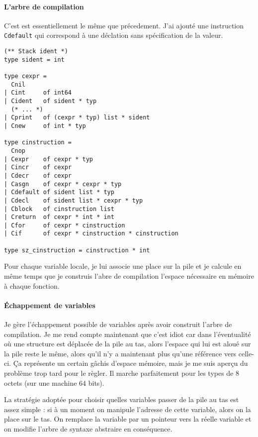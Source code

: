 \documentclass[11pt]{article}
\begin{document}
\paragraph{L'arbre de compilation}

C'est est essentiellement le même que précedement. J'ai ajouté une instruction \texttt{Cdefault} qui correspond à une déclation sans spécification de la valeur.

\begin{verbatim}
(** Stack ident *)
type sident = int

type cexpr =
  Cnil
| Cint     of int64
| Cident   of sident * typ
  (* ... *)
| Cprint   of (cexpr * typ) list * sident
| Cnew     of int * typ

type cinstruction =
  Cnop
| Cexpr    of cexpr * typ
| Cincr    of cexpr
| Cdecr    of cexpr
| Casgn    of cexpr * cexpr * typ
| Cdefault of sident list * typ
| Cdecl    of sident list * cexpr * typ
| Cblock   of cinstruction list
| Creturn  of cexpr * int * int
| Cfor     of cexpr * cinstruction
| Cif      of cexpr * cinstruction * cinstruction

type sz_cinstruction = cinstruction * int
\end{verbatim}

Pour chaque variable locale, je lui associe une place sur la pile et je calcule en même temps que je construis l'abre de compilation l'espace nécessaire en mémoire à chaque fonction.

\paragraph{Échappement de variables}

Je gère l'échappement possible de variables après avoir construit l'arbre de compilation. Je me rend compte maintenant que c'est idiot car dans l'éventualité où une structure est déplacée de la pile au tas, alors l'espace qui lui est aloué sur la pile reste le même, alors qu'il n'y a maintenant plus qu'une référence vers celle-ci. Ça représente un certain gâchis d'espace mémoire, mais je me suis aperçu du problème trop tard pour le règler. Il marche parfaitement pour les types de 8 octets (sur une machine 64 bits).

La stratégie adoptée pour choisir quelles variables passer de la pile au tas est assez simple : si à un moment on manipule l'adresse de cette variable, alors on la place sur le tas. On remplace la variable par un pointeur vers la réelle variable et on modifie l'arbre de syntaxe abstraire en conséquence.
\end{document}
